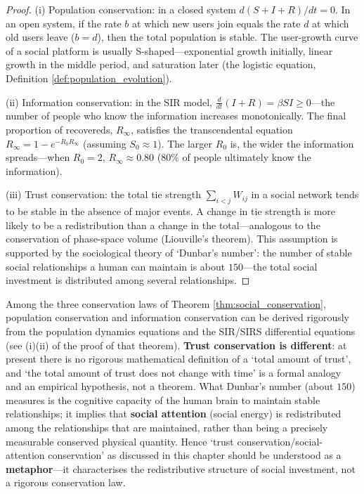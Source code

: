 \begin{proof}
(i) Population conservation: in a closed system $d(S+I+R)/dt = 0$. In an open system, if the rate $b$ at which new users join equals the rate $d$ at which old users leave ($b=d$), then the total population is stable. The user-growth curve of a social platform is usually S-shaped---exponential growth initially, linear growth in the middle period, and saturation later (the logistic equation, Definition \ref{def:population_evolution}).

(ii) Information conservation: in the SIR model, $\frac{d}{dt}(I+R) = \beta S I \ge 0$---the number of people who know the information increases monotonically. The final proportion of recovereds, $R_{\infty}$, satisfies the transcendental equation $R_{\infty} = 1 - e^{-R_0 R_{\infty}}$ (assuming $S_0 \approx 1$). The larger $R_0$ is, the wider the information spreads---when $R_0 = 2$, $R_{\infty} \approx 0.80$ ($80\%$ of people ultimately know the information).

(iii) Trust conservation: the total tie strength $\sum_{i<j} W_{ij}$ in a social network tends to be stable in the absence of major events. A change in tie strength is more likely to be a redistribution than a change in the total---analogous to the conservation of phase-space volume (Liouville's theorem). This assumption is supported by the sociological theory of `Dunbar's number': the number of stable social relationships a human can maintain is about $150$---the total social investment is distributed among several relationships.
\end{proof}

\begin{remark}\label{ch27_trust_metaphor}
Among the three conservation laws of Theorem \ref{thm:social_conservation}, population conservation and information conservation can be derived rigorously from the population dynamics equations and the SIR/SIRS differential equations (see (i)(ii) of the proof of that theorem). \textbf{Trust conservation is different}: at present there is no rigorous mathematical definition of a `total amount of trust', and `the total amount of trust does not change with time' is a formal analogy and an empirical hypothesis, not a theorem. What Dunbar's number (about $150$) measures is the cognitive capacity of the human brain to maintain stable relationships; it implies that \textbf{social attention} (social energy) is redistributed among the relationships that are maintained, rather than being a precisely measurable conserved physical quantity. Hence `trust conservation/social-attention conservation' as discussed in this chapter should be understood as a \textbf{metaphor}---it characterises the redistributive structure of social investment, not a rigorous conservation law.
\end{remark}

